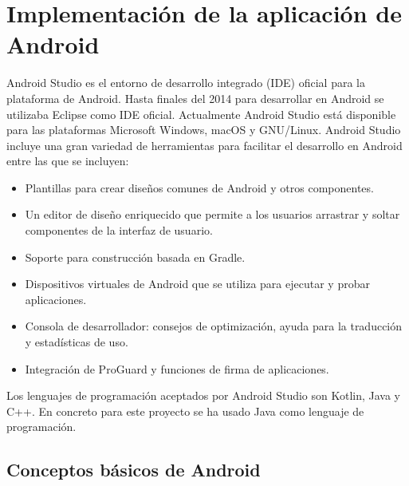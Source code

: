 \section{Implementaci\'on de la aplicaci\'on de Android}
\label{android}

Android Studio es el entorno de desarrollo integrado (IDE) oficial para la plataforma de Android. Hasta finales del 2014 para desarrollar en Android se utilizaba Eclipse como IDE oficial. Actualmente Android Studio est\'a disponible para las plataformas Microsoft Windows, macOS y GNU/Linux. Android Studio incluye una gran variedad de herramientas para facilitar el desarrollo en Android entre las que se incluyen:

\begin {itemize}
\item Plantillas para crear dise\~nos comunes de Android y otros componentes.
\item Un editor de dise\~no enriquecido que permite a los usuarios arrastrar y soltar componentes de la interfaz de usuario.
\item Soporte para construcci\'on basada en Gradle.
\item Dispositivos virtuales de Android que se utiliza para ejecutar y probar aplicaciones.
\item Consola de desarrollador: consejos de optimizaci\'on, ayuda para la traducci\'on y estad\'isticas de uso.
\item Integraci\'on de ProGuard y funciones de firma de aplicaciones.
\end {itemize}
 
Los lenguajes de programaci\'on aceptados por Android Studio son Kotlin, Java y C++. En concreto para este proyecto se ha usado Java como lenguaje de programaci\'on.

\subsection {Conceptos b\'asicos de Android}

